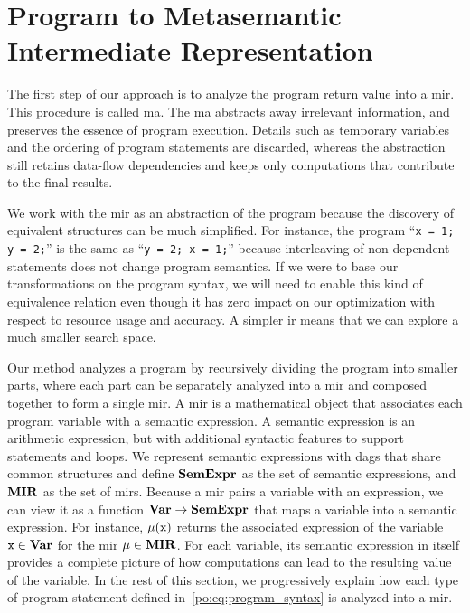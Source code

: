 \section{Program to Metasemantic Intermediate Representation}
\label{po:sec:program_to_mir}

The first step of our approach is to analyze the program return value into
a \gls{mir}\@.  This procedure is called \gls{ma}.  The \gls{ma} abstracts
away irrelevant information, and preserves the essence of program execution.
Details such as temporary variables and the ordering of program statements are
discarded, whereas the abstraction still retains data-flow dependencies and
keeps only computations that contribute to the final results.

We work with the \gls{mir} as an abstraction of the program because the
discovery of equivalent structures can be much simplified.  For instance,
the program ``\verb|x = 1; y = 2;|'' is the same as ``\verb|y = 2; x = 1;|''
because interleaving of non-dependent statements does not change program
semantics.  If we were to base our transformations on the program syntax, we
will need to enable this kind of equivalence relation even though it has zero
impact on our optimization with respect to resource usage and accuracy.  A
simpler \gls{ir} means that we can explore a much smaller search space.

Our method analyzes a program by recursively dividing the program into smaller
parts, where each part can be separately analyzed into a \gls{mir} and
composed together to form a single \gls{mir}\@.  A \gls{mir} is a mathematical
object that associates each program variable with a semantic expression.  A
semantic expression is an arithmetic expression, but with additional syntactic
features to support \iflit{} statements and \whilelit{} loops.  We represent
semantic expressions with \glspl{dag} that share common structures and define
$\mathbf{SemExpr}$ as the set of semantic expressions, and $\mathbf{MIR}$ as the set of
\glspl{mir}.  Because a \gls{mir} pairs a variable with an expression, we
can view it as a function $\mathbf{Var} \to \mathbf{SemExpr}$ that maps a variable into
a semantic expression.  For instance, $\mu(\texttt{x})$ returns the associated
expression of the variable $\texttt{x} \in \mathbf{Var}$ for the \gls{mir} $\mu \in
\mathbf{MIR}$.  For each variable, its semantic expression in itself provides a
complete picture of how computations can lead to the resulting value of the
variable.  In the rest of this section, we progressively explain how each type
of program statement defined in~\eqref{po:eq:program_syntax} is analyzed into a
\gls{mir}\@.

